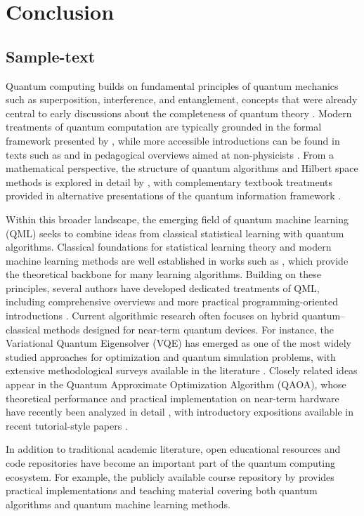 \section{Conclusion}\label{section:conclusion}



\subsection{Sample-text}

Quantum computing builds on fundamental principles of quantum mechanics such as
superposition, interference, and entanglement, concepts that were already central
to early discussions about the completeness of quantum theory
\parencite{einstein_podolsky_rosen_1935}. Modern treatments of quantum computation
are typically grounded in the formal framework presented by
\textcite{nielsen_chuang_2000}, while more accessible introductions can be found
in texts such as \textcite{rieffel_polak_2011} and in pedagogical overviews aimed
at non-physicists \parencite{rieffel_intro_qc_nonphys_2000}. From a mathematical
perspective, the structure of quantum algorithms and Hilbert space methods is
explored in detail by \textcite{scherer_math_qc}, with complementary textbook
treatments provided in alternative presentations of the quantum information
framework \parencite{michaelsen_isaac_qci}. 

Within this broader landscape, the emerging field of quantum machine learning
(QML) seeks to combine ideas from classical statistical learning with quantum
algorithms. Classical foundations for statistical learning theory and modern
machine learning methods are well established in works such as
\textcite{hastie}, which provide the theoretical backbone for many learning
algorithms. Building on these principles, several authors have developed
dedicated treatments of QML, including comprehensive overviews
\parencite{conti_qml, schuld_qml} and more practical programming-oriented
introductions \parencite{pattanayak_qml_python}. Current algorithmic research
often focuses on hybrid quantum–classical methods designed for near-term
quantum devices. For instance, the Variational Quantum Eigensolver (VQE) has
emerged as one of the most widely studied approaches for optimization and
quantum simulation problems, with extensive methodological surveys available
in the literature \parencite{tilly_vqe_review_2022}. Closely related ideas appear
in the Quantum Approximate Optimization Algorithm (QAOA), whose theoretical
performance and practical implementation on near-term hardware have recently
been analyzed in detail \parencite{zhou_qaoa_perf_2025}, with introductory
expositions available in recent tutorial-style papers
\parencite{giovagnoli_qoao_intro}. 

In addition to traditional academic literature, open educational resources and
code repositories have become an important part of the quantum computing
ecosystem. For example, the publicly available course repository by
\textcite{compphysics_qcml_2026} provides practical implementations and teaching
material covering both quantum algorithms and quantum machine learning methods.